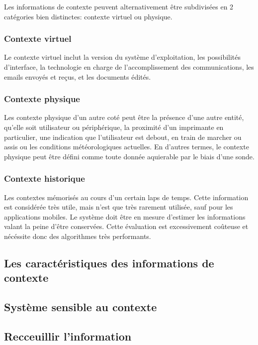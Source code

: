 Les informations de contexte peuvent alternativement être subdivisées en 2
catégories bien distinctes: contexte virtuel ou physique.

\subsubsection{Contexte virtuel}

Le contexte virtuel inclut la version du système d'exploitation, les
possibilités d'interface, la technologie en charge de l'accomplissement des
communications, les emails envoyés et reçus, et les documents édités.

\subsubsection{Contexte physique}

Les contexte physique d'un autre coté peut être la présence d'une autre entité,
qu'elle soit utilisateur ou périphérique, la proximité d'un imprimante en
particulier, une indication que l'utilisateur est debout, en train de marcher ou
assis ou les conditions météorologiques actuelles. En d'autres termes, le
contexte physique peut être défini comme toute donnée aquierable par le biais
d'une sonde.

\subsubsection{Contexte historique}

Les contextes mémorisés au cours d'un certain laps de temps. Cette information
est considérée très utile, mais n'est que très rarement utilisée, sauf pour les
applications mobiles. Le système doit être en mesure d'estimer les informations
valant la peine d'être conservées. Cette évaluation est excessivement coûteuse
et nécéssite donc des algorithmes très performants.

\subsection{Les caractéristiques des informations de contexte}

\subsection{Système sensible au contexte}

\subsection{Recceuillir l'information}

